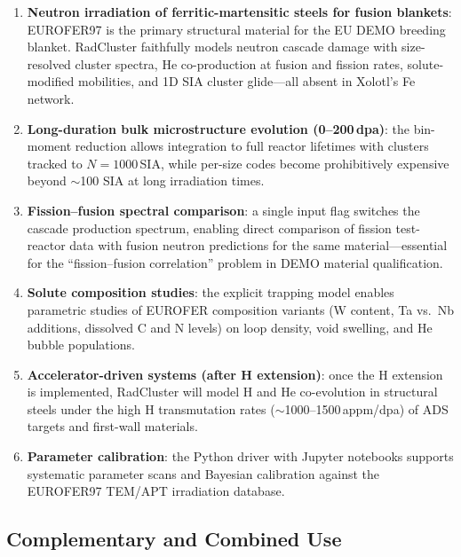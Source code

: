 \documentclass[12pt,letterpaper]{article}
\begin{document}
\begin{enumerate}
  \item \textbf{Neutron irradiation of ferritic-martensitic steels for
    fusion blankets}: EUROFER97 is the primary structural material for
    the EU DEMO breeding blanket.  RadCluster faithfully models neutron
    cascade damage with size-resolved cluster spectra, He co-production
    at fusion and fission rates, solute-modified mobilities, and 1D SIA
    cluster glide---all absent in Xolotl's Fe network.

  \item \textbf{Long-duration bulk microstructure evolution
    (0--200\,dpa)}: the bin-moment reduction allows integration to full
    reactor lifetimes with clusters tracked to $N = 1000$\,SIA, while
    per-size codes become prohibitively expensive beyond $\sim$100 SIA
    at long irradiation times.

  \item \textbf{Fission--fusion spectral comparison}: a single input
    flag switches the cascade production spectrum, enabling direct
    comparison of fission test-reactor data with fusion neutron
    predictions for the same material---essential for the
    ``fission--fusion correlation'' problem in DEMO material qualification.

  \item \textbf{Solute composition studies}: the explicit trapping model
    enables parametric studies of EUROFER composition variants
    (W content, Ta vs.\ Nb additions, dissolved C and N levels) on
    loop density, void swelling, and He bubble populations.

  \item \textbf{Accelerator-driven systems (after H extension)}: once
    the H extension is implemented, RadCluster will model H and He
    co-evolution in structural steels under the high H transmutation
    rates ($\sim$1000--1500\,appm/dpa) of ADS targets and first-wall
    materials.

  \item \textbf{Parameter calibration}: the Python driver with Jupyter
    notebooks supports systematic parameter scans and Bayesian
    calibration against the EUROFER97 TEM/APT irradiation database.
\end{enumerate}

\subsection{Complementary and Combined Use}
\end{document}
